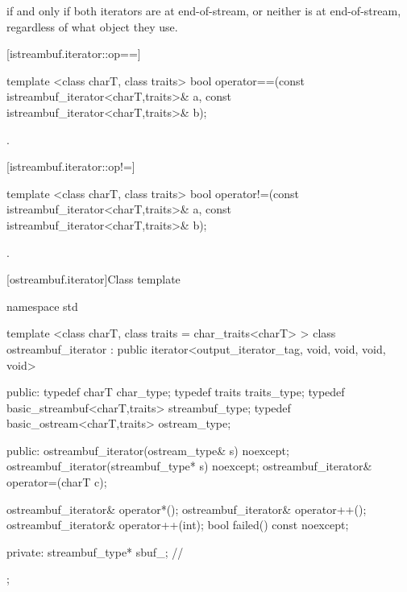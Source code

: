 \begin{itemdescr}
\pnum
\returns
{}
if and only if both iterators are at end-of-stream,
or neither is at end-of-stream, regardless of what
object they use.
\end{itemdescr}

[istreambuf.iterator::op==]{}

%
\begin{itemdecl}
template <class charT, class traits>
  bool operator==(const istreambuf_iterator<charT,traits>& a,
                  const istreambuf_iterator<charT,traits>& b);
\end{itemdecl}

\begin{itemdescr}
\pnum
\returns
{}.
\end{itemdescr}

[istreambuf.iterator::op!=]{}

%
\begin{itemdecl}
template <class charT, class traits>
  bool operator!=(const istreambuf_iterator<charT,traits>& a,
                  const istreambuf_iterator<charT,traits>& b);
\end{itemdecl}

\begin{itemdescr}
\pnum
\returns
{}.
\end{itemdescr}

[ostreambuf.iterator]{Class template }

%
\begin{codeblock}
namespace std {
  template <class charT, class traits = char_traits<charT> >
  class ostreambuf_iterator :
    public iterator<output_iterator_tag, void, void, void, void> {
  public:
    typedef charT                         char_type;
    typedef traits                        traits_type;
    typedef basic_streambuf<charT,traits> streambuf_type;
    typedef basic_ostream<charT,traits>   ostream_type;

  public:
    ostreambuf_iterator(ostream_type& s) noexcept;
    ostreambuf_iterator(streambuf_type* s) noexcept;
    ostreambuf_iterator& operator=(charT c);

    ostreambuf_iterator& operator*();
    ostreambuf_iterator& operator++();
    ostreambuf_iterator& operator++(int);
    bool failed() const noexcept;

  private:
    streambuf_type* sbuf_;                // \expos
  };
}
\end{codeblock}

